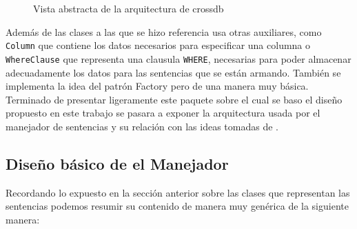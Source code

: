 \begin{figure}
  \centering
   \label{fig:subfig:crossdb:base-idea}
  \qquad 
   \label{fig:subfig:crossdb:base-idea-select}
  \caption{Vista abstracta de la arquitectura de crossdb}
  \label{fig:crossdb:base-idea}
\end{figure}

Además de las clases a las que se hizo referencia \cc usa otras auxiliares, como \verb=Column= que contiene los datos necesarios para especificar una columna o \verb=WhereClause= que representa una clausula \verb=WHERE=, necesarias para poder almacenar adecuadamente los datos para las sentencias que se están armando. También se implementa la idea del patrón Factory pero de una manera muy básica. Terminado de presentar ligeramente este paquete sobre el cual se baso el diseño propuesto en este trabajo se pasara a exponer la arquitectura usada por el manejador de sentencias y su relación con las ideas tomadas de \cc.

\subsection{Diseño básico de el Manejador}
Recordando lo expuesto en la sección anterior sobre las clases que representan las sentencias podemos resumir su contenido de manera muy genérica de la siguiente manera:

